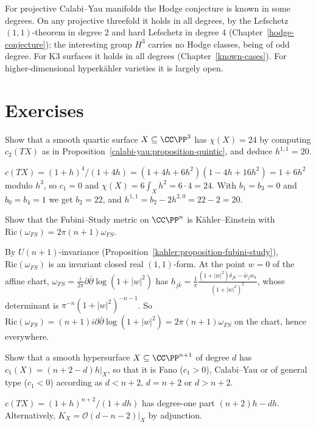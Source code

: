 \begin{remark}\label{calabi-yau:remark-hodge-conjecture}
For projective Calabi--Yau manifolds the Hodge conjecture is known in some degrees. On any projective threefold it holds in all degrees, by the Lefschetz $(1,1)$-theorem
in degree $2$ and hard Lefschetz in degree $4$ (Chapter~\ref{hodge-conjecture}); the interesting group $H^3$ carries no Hodge classes, being of odd degree. For K3 surfaces it holds
in all degrees (Chapter~\ref{known-cases}). For higher-dimensional hyperk\"ahler varieties it is largely open.
\end{remark}

\section{Exercises}\label{calabi-yau:section-exercises}

\begin{exercise}\label{calabi-yau:exercise-k3-hodge}
Show that a smooth quartic surface $X \subseteq \CC\PP^3$ has $\chi(X) = 24$ by computing $c_2(TX)$ as in Proposition~\ref{calabi-yau:proposition-quintic}, and deduce $h^{1,1} = 20$.
\end{exercise}

\begin{solution}
$c(TX) = (1 + h)^4/(1 + 4h) = (1 + 4h + 6h^2)(1 - 4h + 16h^2) = 1 + 6h^2$ modulo $h^3$, so $c_1 = 0$ and $\chi(X) = 6\int_Xh^2 = 6 \cdot 4 = 24$. With $b_1 = b_3 = 0$ and $b_0 = b_4 = 1$
we get $b_2 = 22$, and $h^{1,1} = b_2 - 2h^{2,0} = 22 - 2 = 20$.
\end{solution}

\begin{exercise}\label{calabi-yau:exercise-ricci-projective}
Show that the Fubini--Study metric on $\CC\PP^n$ is K\"ahler--Einstein with $\mathrm{Ric}(\omega_{FS}) = 2\pi(n + 1)\omega_{FS}$.
\end{exercise}

\begin{solution}
By $U(n+1)$-invariance (Proposition~\ref{kahler:proposition-fubini-study}), $\mathrm{Ric}(\omega_{FS})$ is an invariant closed real $(1,1)$-form. At the point $w = 0$ of the affine
chart, $\omega_{FS} = \frac{i}{2\pi}\partial\bar\partial\log(1 + |w|^2)$ has $h_{j\bar k} = \frac1\pi\frac{(1 + |w|^2)\delta_{jk} - \bar w_jw_k}{(1 + |w|^2)^2}$, whose determinant is
$\pi^{-n}(1 + |w|^2)^{-n-1}$. So $\mathrm{Ric}(\omega_{FS}) = (n + 1)i\partial\bar\partial\log(1 + |w|^2) = 2\pi(n + 1)\omega_{FS}$ on the chart, hence everywhere.
\end{solution}

\begin{exercise}\label{calabi-yau:exercise-hypersurface-euler}
Show that a smooth hypersurface $X \subseteq \CC\PP^{n+1}$ of degree $d$ has $c_1(X) = (n + 2 - d)h|_X$, so that it is Fano ($c_1 > 0$), Calabi--Yau or of general type
($c_1 < 0$) according as $d < n + 2$, $d = n + 2$ or $d > n + 2$.
\end{exercise}

\begin{solution}
$c(TX) = (1 + h)^{n+2}/(1 + dh)$ has degree-one part $(n + 2)h - dh$. Alternatively, $K_X = \mathcal{O}(d - n - 2)|_X$ by adjunction.
\end{solution}
